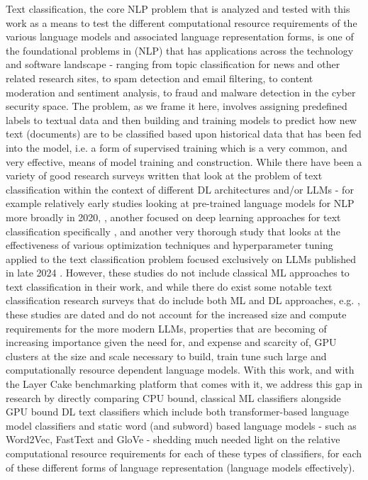 \documentclass[final]{clv2025-revised}
\begin{document}
Text classification, the core NLP problem that is analyzed and tested with this work as a means to test the different computational resource requirements of the various language models and associated language representation forms, is one of the foundational problems in (NLP) that has applications across the technology and software landscape - ranging from topic classification for news and other related research sites, to spam detection and email filtering, to content moderation and sentiment analysis, to fraud and malware detection in the cyber security space. The problem, as we frame it here, involves assigning predefined labels to textual data and then building and training models to predict how new text (documents) are to be classified based upon historical data that has been fed into the model, i.e. a form of supervised training which is a very common, and very effective, means of model training and construction. While there have been a variety of good research surveys written that look at the problem of text classification within the context of different DL architectures and/or LLMs - for example relatively early studies looking at pre-trained language models for NLP more broadly in 2020, \cite{qiu2020pre}, another focused on deep learning approaches for text classification specifically \cite{minaee2021deep}, and another very thorough study that looks at the effectiveness of various optimization techniques and hyperparameter tuning applied to the text classification problem focused exclusively on LLMs published in late 2024 \cite{trust2024study}. However, these studies do not include classical ML approaches to text classification in their work, and while there do exist some notable text classification research surveys that do include both ML and DL approaches, e.g. \cite{liu2019roberta}, these studies are dated and do not account for the increased size and compute requirements for the more modern LLMs, properties that are becoming of increasing importance given the need for, and expense and scarcity of, GPU clusters at the size and scale necessary to build, train tune such large and computationally resource dependent language models. With this work, and with the Layer Cake benchmarking platform that comes with it, we address this gap in research by directly comparing CPU bound, classical ML classifiers alongside GPU bound DL text classifiers which include both transformer-based language model classifiers and static word (and subword) based language models - such as Word2Vec, FastText and GloVe - shedding much needed light on the relative computational resource requirements for each of these types of classifiers, for each of these different forms of language representation (language models effectively).  
\end{document}
